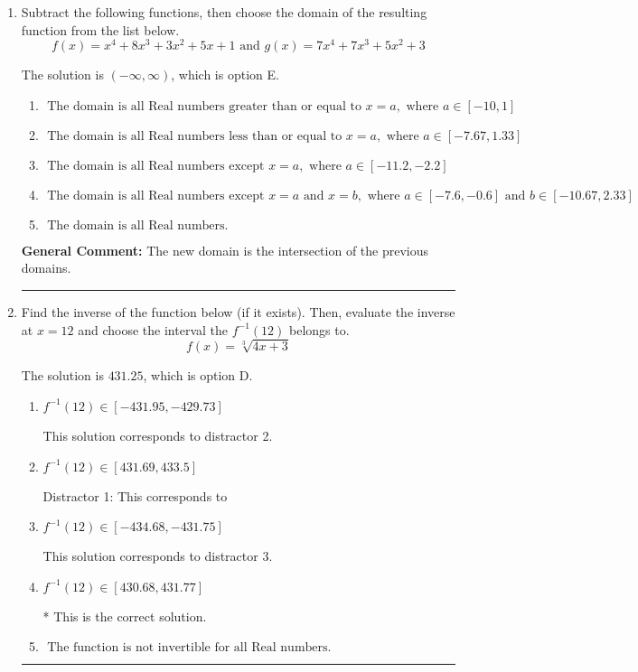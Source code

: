 \documentclass{extbook}[14pt]
\newcommand{\litem}[1]{\item #1

\rule{\textwidth}{0.4pt}}
\begin{document}
\begin{enumerate}\litem{
Subtract the following functions, then choose the domain of the resulting function from the list below.
\[ f(x) = x^{4} +8 x^{3} +3 x^{2} +5 x + 1 \text{ and } g(x) = 7x^{4} +7 x^{3} +5 x^{2} + 3 \]

The solution is \( (-\infty, \infty) \), which is option E.\begin{enumerate}[label=\Alph*.]
\item \( \text{ The domain is all Real numbers greater than or equal to } x = a, \text{ where } a \in [-10, 1] \)


\item \( \text{ The domain is all Real numbers less than or equal to } x = a, \text{ where } a \in [-7.67, 1.33] \)


\item \( \text{ The domain is all Real numbers except } x = a, \text{ where } a \in [-11.2, -2.2] \)


\item \( \text{ The domain is all Real numbers except } x = a \text{ and } x = b, \text{ where } a \in [-7.6, -0.6] \text{ and } b \in [-10.67, 2.33] \)


\item \( \text{ The domain is all Real numbers. } \)


\end{enumerate}

\textbf{General Comment:} The new domain is the intersection of the previous domains.
}
\litem{
Find the inverse of the function below (if it exists). Then, evaluate the inverse at $x = 12$ and choose the interval the $f^{-1}(12)$ belongs to.
\[ f(x) = \sqrt[3]{4 x + 3} \]

The solution is \( 431.25 \), which is option D.\begin{enumerate}[label=\Alph*.]
\item \( f^{-1}(12) \in [-431.95, -429.73] \)

 This solution corresponds to distractor 2.
\item \( f^{-1}(12) \in [431.69, 433.5] \)

 Distractor 1: This corresponds to 
\item \( f^{-1}(12) \in [-434.68, -431.75] \)

 This solution corresponds to distractor 3.
\item \( f^{-1}(12) \in [430.68, 431.77] \)

* This is the correct solution.
\item \( \text{ The function is not invertible for all Real numbers. } \)


\end{enumerate}}
\end{enumerate}
\end{document}
